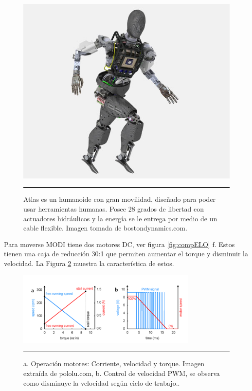 \begin{figure}[htbp]
	\centering
		\includegraphics[width=\textwidth]{./Figures/AtlasCADlr.jpg}
		\rule{35em}{0.5pt}
	\caption[Robot Atlas]{Atlas es un humanoide con gran movilidad, diseñado para poder usar herramientas humanas. Posee 28 grados de libertad con actuadores hidráulicos y la energía se le entrega por medio de un cable flexible. Imagen tomada de bostondynamics.com.}
	\label{fig:Atlas}
\end{figure}


Para moverse MODI tiene dos motores DC, ver figura \ref{fig:compELO} f. Estos tienen una caja de reducción 30:1 que permiten aumentar el torque y disminuir la velocidad. La Figura \ref{fig:DCMotor} muestra la característica de estos. 

\begin{figure}[htbp]
	\centering
		\includegraphics[width=0.8\textwidth]{./Figures/graficosMotores.png}
		\rule{35em}{0.5pt}
	\caption[Gráficos Motor DC]{a. Operación motores: Corriente, velocidad y torque. Imagen extraída de pololu.com, b. Control de velocidad PWM, se observa como disminuye la velocidad según ciclo de trabajo..}
	\label{fig:DCMotor}
\end{figure}

